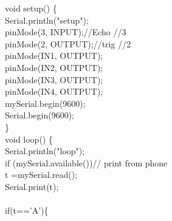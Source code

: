\documentclass[12pt,a4paper]{report}
\begin{document}
void setup() \{\\
  Serial.println("setup");\\
  pinMode(3, INPUT);//Echo //3\\
  pinMode(2, OUTPUT);//trig //2\\
  pinMode(IN1, OUTPUT);\\
  pinMode(IN2, OUTPUT);\\
  pinMode(IN3, OUTPUT);\\
  pinMode(IN4, OUTPUT);\\
  mySerial.begin(9600);\\
  Serial.begin(9600);\\
\}\\
void loop() \{\\
Serial.println("loop");\\
 if (mySerial.available()){// print from phone\\
    t =mySerial.read();\\
    Serial.print(t);\\
    \ }\\
    if(t=='A')\{\\
\end{document}

